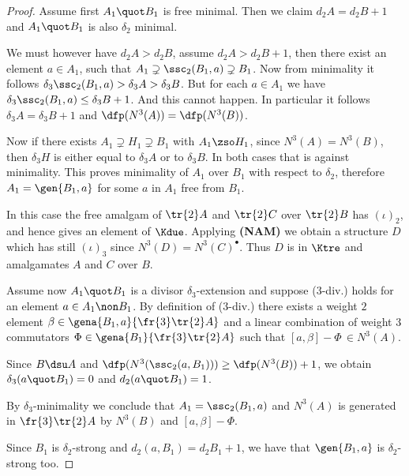 \begin{proof}
\medskip
Assume first $A_{1}\quot B_{1}$ is free minimal. %
Then we claim $d_{2}A=d_{2}B+1$ and $A_{1}\quot B_{1}$ is also $\delta_{2}$ minimal.

We must however have $d_{2}A>d_{2}B$, assume $d_{2}A>d_{2}B+1$, then there exist an element $a\in A_{1}$,
such that $A_{1}\supsetneq\ssc_{2}(B_{1},a)\supsetneq B_{1}$. Now from minimality it follows
$\delta_{3}\ssc_{2}(B_{1},a)>\delta_{3}A>\delta_{3}B$. But for each $a\in A_{1}$ we have $\delta_{3}\ssc_{2}
(B_{1},a)\leq\delta_{3}B+1$. And this cannot happen.
In particular it follows $\delta_{3}A=\delta_{3}B+1$ and $\dfp(N^{3}(A))=\dfp(N^{3}(B))$.

Now if there exists $A_{1}\supsetneq H_{1}\supsetneq B_{1}$ with $A_{1}\zso H_{1}$, since
$N^{3}(A)=N^{3}(B)$, then $\delta_{3}H$ is either equal to $\delta_{3}A$ or to $\delta_{3}B$. In both cases
that is against minimality. This proves minimality of $A_{1}$ over $B_{1}$ with respect to $\delta_{2}$,
therefore $A_{1}=\gen{B_{1},a}$ for some $a$ in $A_{1}$ free from $B_{1}$.

In this case the free amalgam of $\tr{2}A$ and $\tr{2}C$ over $\tr{2}B$ has $(\iota)_{2}$, and hence gives an element of $\Kdue$. Applying {\bf (NAM)} we obtain a structure $D$ which has still $(\iota)_{3}$ since $N^{3}(D)=N^{3}(C)^{\bullet}$.
Thus $D$ is in $\Ktre$ and amalgamates $A$ and $C$ over $B$.

\medskip
Assume now $A_{1}\quot B_{1}$ is a divisor $\delta_{3}$-extension and suppose ($3$-div.) holds for an
element $a\in A_{1}\non B_{1}$.
By definition of ($3$-div.) there exists a weight $2$ element $\beta\in\gena{B_{1},a}{\fr{3}\tr{2}A}$ and a linear combination of weight $3$ commutators
$\Phi\in\gena{B_{1}}{\fr{3}\tr{2}A}$ such that $[a,\beta]-\Phi\,\in N^{3}(A)$.

Since $B\dsu A$ and $\dfp(N^{3}(\ssc_{2}(a,B_{1})))\geq\dfp(N^{3}(B))+1$,
we obtain $\delta_{3}(a\quot B_{1})=0$ and $d_{2}(a\quot B_{1})=1$.

By $\delta_{3}$-minimality we conclude
that $A_{1}=\ssc_{2}(B_{1},a)$ and $N^{3}(A)$ is generated
in $\fr{3}\tr{2}A$ by $N^{3}(B)$ and $[a,\beta]-\Phi$.

Since $B_{1}$ is $\delta_{2}$-strong and $d_{2}(a,B_{1})=d_{2}B_{1}+1$, we have
that $\gen{B_{1},a}$ is $\delta_{2}$-strong too.


\end{proof}
